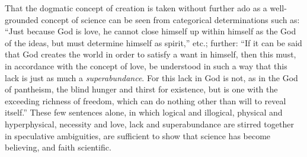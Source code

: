 \documentclass[12pt]{book}
\newcommand{\opage}[1]{\marginnote{\footnotesize\textit{[#1]}}}
\begin{document}
That the dogmatic concept of creation is taken without further ado as a well-grounded concept of science can be seen from categorical determinations such as: ``Just because God is love, he cannot close himself up within himself as the God of the ideas, but must determine himself as spirit,'' etc.; further: ``If it can be said that God creates the world in order to satisfy a want in himself, then this must, in accordance with the concept of love, be understood in such a way that this
\opage{98}\setcounter{footnote}{0}%
lack is just as much a \emph{superabundance}. For this lack in God is not, as in the God of pantheism, the blind hunger and thirst for existence, but is one with the exceeding richness of freedom, which can do nothing other than will to reveal itself.'' These few sentences alone, in which logical and illogical, physical and hyperphysical, necessity and love, lack and superabundance are stirred together in speculative ambiguities, are sufficient to show that science has become believing, and faith scientific.
\end{document}
